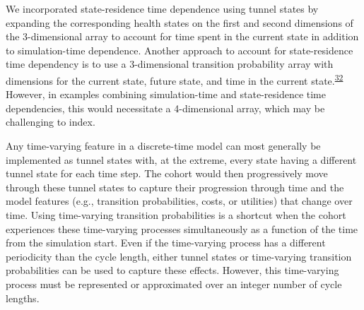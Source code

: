 \documentclass[
]{article}
\begin{document}
We incorporated state-residence time dependence using tunnel states by expanding the corresponding health states on the first and second dimensions of the 3-dimensional array to account for time spent in the current state in addition to simulation-time dependence. Another approach to account for state-residence time dependency is to use a 3-dimensional transition probability array with dimensions for the current state, future state, and time in the current state.\textsuperscript{\protect\hyperlink{ref-Hawkins2005}{32}} However, in examples combining simulation-time and state-residence time dependencies, this would necessitate a 4-dimensional array, which may be challenging to index.

Any time-varying feature in a discrete-time model can most generally be implemented as tunnel states with, at the extreme, every state having a different tunnel state for each time step. The cohort would then progressively move through these tunnel states to capture their progression through time and the model features (e.g., transition probabilities, costs, or utilities) that change over time. Using time-varying transition probabilities is a shortcut when the cohort experiences these time-varying processes simultaneously as a function of the time from the simulation start. Even if the time-varying process has a different periodicity than the cycle length, either tunnel states or time-varying transition probabilities can be used to capture these effects. However, this time-varying process must be represented or approximated over an integer number of cycle lengths.
\end{document}
